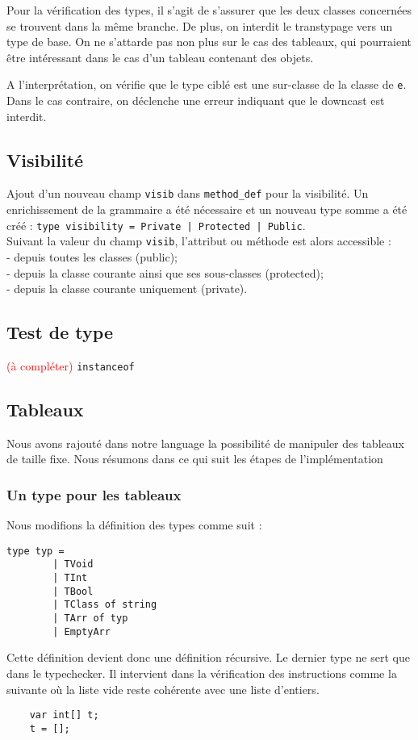 \documentclass{article}
\begin{document}
Pour la vérification des types, il s'agit de s'assurer que les deux classes concernées 
se trouvent dans la même branche. De plus, on interdit le transtypage vers un type de base.
On ne s'attarde pas non plus sur le cas des tableaux, qui pourraient être intéressant dans le cas d'un tableau contenant des objets.

A l'interprétation, on vérifie que le type ciblé est une sur-classe de la classe de \texttt{e}. Dans le cas contraire, on déclenche 
une erreur indiquant que le downcast est interdit.

\subsection{Visibilité}
Ajout d'un nouveau champ \texttt{visib} dans \texttt{method\_def} pour la visibilité. Un enrichissement de la grammaire a été nécessaire et un nouveau type somme a été créé : \texttt{type visibility = Private | Protected | Public}.\\
Suivant la valeur du champ \texttt{visib}, l'attribut ou méthode est alors accessible :
\smallskip \\
- depuis toutes les classes (public);\\
- depuis la classe courante ainsi que ses sous-classes (protected);\\
- depuis la classe courante uniquement (private).
\subsection{Test de type}
\textcolor{red}{(à compléter)}
\texttt{instanceof}

\subsection{Tableaux}
Nous avons rajouté dans notre language la possibilité de manipuler 
des tableaux de taille fixe. Nous résumons dans ce qui suit les étapes de l'implémentation
\subsubsection{Un type pour les tableaux} 
Nous modifions la définition des types comme suit : 
\begin{lstlisting}[style=mystyle]
    type typ =
        | TVoid
        | TInt
        | TBool
        | TClass of string
        | TArr of typ
        | EmptyArr
\end{lstlisting}
Cette définition devient donc une définition récursive.
Le dernier type ne sert que dans le typechecker.
Il intervient dans la vérification des instructions comme la suivante où 
la liste vide reste cohérente avec une liste d'entiers.
\begin{verbatim}
    var int[] t;
    t = [];
\end{verbatim}
\end{document}

